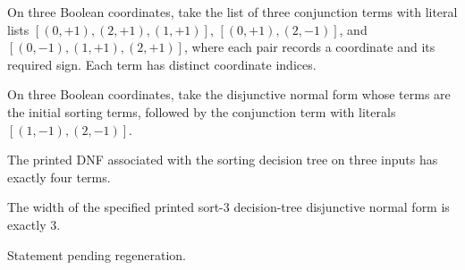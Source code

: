 \begin{definition}
\label{FABL.sort3DecisionTreeDNFPrefix}
\leanok
{}
On three Boolean coordinates, take the list of three conjunction terms with literal
lists $[(0,+1),(2,+1),(1,+1)]$, $[(0,+1),(2,-1)]$, and $[(0,-1),(1,+1),(2,+1)]$, where
each pair records a coordinate and its required sign. Each term has distinct coordinate
indices.
\end{definition}

\begin{definition}
\label{FABL.sort3DecisionTreeDNFPrinted}
\leanok
{}
On three Boolean coordinates, take the disjunctive normal form whose terms are the
initial sorting terms, followed by the conjunction term with literals $[(1,-1),(2,-1)]$.
\end{definition}

\begin{theorem}
\label{FABL.size_sort3DecisionTreeDNFPrinted}
\leanok
{}
The printed DNF associated with the sorting decision tree on three inputs has exactly
four terms.
\end{theorem}

\begin{theorem}
\label{FABL.width_sort3DecisionTreeDNFPrinted}
\leanok
{}
The width of the specified printed sort-3 decision-tree disjunctive normal form is
exactly $3$.
\end{theorem}

\begin{theorem}
\label{FABL.sort3DecisionTreeDNFPrinted_counterexample}
\leanok
{}
Statement pending regeneration.
\end{theorem}

